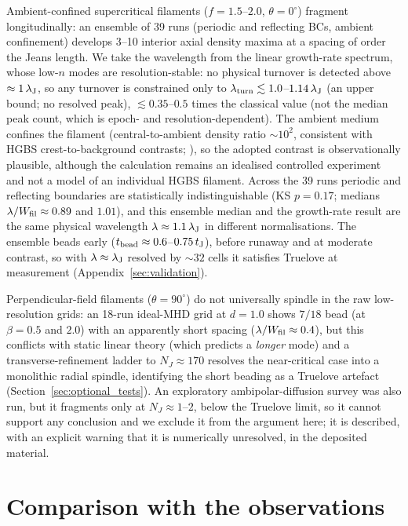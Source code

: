 \documentclass[usenatbib,twoside,twocolumn]{mnras}
\begin{document}
Ambient-confined supercritical filaments ($f=1.5$--$2.0$, $\theta=0^\circ$) fragment longitudinally: an ensemble of 39 runs (periodic and reflecting BCs, ambient confinement) develops 3--10 interior axial density maxima at a spacing of order the Jeans length. We take the wavelength from the linear growth-rate spectrum, whose low-$n$ modes are resolution-stable: no physical turnover is detected above $\approx1\,\lambda_{\rm J}$, so any turnover is constrained only to $\lambda_{\rm turn}\lesssim1.0$--$1.14\,\lambda_{\rm J}$ (an upper bound; no resolved peak), $\lesssim0.35$--$0.5$ times the classical value (not the median peak count, which is epoch- and resolution-dependent). The ambient medium confines the filament (central-to-ambient density ratio $\sim10^2$, consistent with HGBS crest-to-background contrasts; \citealt{Arzoumanian2019}), so the adopted contrast is observationally plausible, although the calculation remains an idealised controlled experiment and not a model of an individual HGBS filament. Across the 39 runs periodic and reflecting boundaries are statistically indistinguishable (KS $p=0.17$; medians $\lambda/W_{\rm fil}\approx0.89$ and $1.01$), and this ensemble median and the growth-rate result are the same physical wavelength $\lambda\approx1.1\,\lambda_{\rm J}$ in different normalisations. The ensemble beads early ($t_{\rm bead}\approx0.6$--$0.75\,t_{\rm J}$), before runaway and at moderate contrast, so with $\lambda\approx\lambda_{\rm J}$ resolved by ${\sim}32$ cells it satisfies Truelove at measurement (Appendix~\ref{sec:validation}).

Perpendicular-field filaments ($\theta=90^\circ$) do not universally spindle in the raw low-resolution grids: an 18-run ideal-MHD grid at $d=1.0$ shows $7/18$ bead (at $\beta=0.5$ and $2.0$) with an apparently short spacing ($\lambda/W_{\rm fil}\approx0.4$), but this conflicts with static linear theory (which predicts a \emph{longer} mode) and a transverse-refinement ladder to $N_J\approx170$ resolves the near-critical case into a monolithic radial spindle, identifying the short beading as a Truelove artefact (Section~\ref{sec:optional_tests}). An exploratory ambipolar-diffusion survey was also run, but it fragments only at $N_J\approx1$--$2$, below the Truelove limit, so it cannot support any conclusion and we exclude it from the argument here; it is described, with an explicit warning that it is numerically unresolved, in the deposited material.


\section{Comparison with the observations}
\label{sec:comparison}
\end{document}
